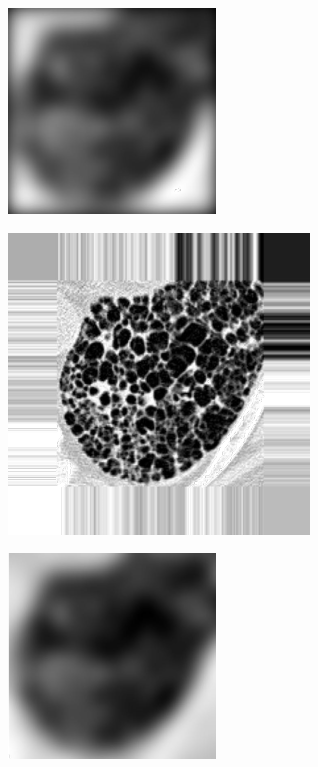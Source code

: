 \documentclass[fleqn,a4paper,oneside,openany]{book}
\begin{document}
\begin{figure}
\begin{minipage}[b]{150pt}
     \label{fig:boundaryConditions1_c}
     \hspace{100pt}
   \end{minipage}
   \begin{minipage}[b]{150pt}
     \centering
     \includegraphics[trim = 0 -34 0 0, clip, scale=0.57]{ZeroPadC_BC.png}
     \label{fig:boundaryConditions1_d}
     \hspace{100pt}
   \end{minipage}
   \begin{minipage}[b]{150pt}
     \centering
     \includegraphics[trim = 0 0 0 0, clip, scale=0.57]{NearestFext_BC.png}
     \label{fig:boundaryConditions1_e}
   \end{minipage}
   \begin{minipage}[b]{150pt}
     \centering
     \includegraphics[trim = 0 -34 0 0, clip, scale=0.57]{NearestC_BC.png}

\end{minipage}
\end{figure}
\end{document}
